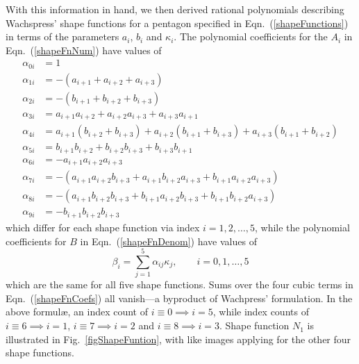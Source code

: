 With this information in hand, we then derived rational polynomials describing Wachspress' shape functions for a pentagon specified in Eqn.~(\ref{shapeFunctions}) in terms of the parameters $a_i$, $b_i$ and $\kappa_i$.  The polynomial coefficients for the $A_i$ in Eqn.~(\ref{shapeFnNum}) have values of
\begin{subequations}
	\label{shapeFnCoefs}
	\begin{align}
	\alpha_{0i} & = 1 \\
	\alpha_{1i} & = -( a_{i+1} + a_{i+2} + a_{i+3} ) \\
	\alpha_{2i} & = -( b_{i+1} + b_{i+2} + b_{i+3} ) \\
	\alpha_{3i} & = a_{i+1} a_{i+2} + a_{i+2} a_{i+3} + a_{i+3} a_{i+1} \\
	\alpha_{4i} & = a_{i+1} ( b_{i+2} + b_{i+3} ) + a_{i+2} ( b_{i+1} + 
	b_{i+3} ) + a_{i+3} ( b_{i+1} + b_{i+2} ) \\
	\alpha_{5i} & = b_{i+1} b_{i+2} + b_{i+2} b_{i+3} + b_{i+3} b_{i+1} \\
	\alpha_{6i} & = -a_{i+1} a_{i+2} a_{i+3} \\
	\alpha_{7i} & = -( a_{i+1} a_{i+2} b_{i+3} + a_{i+1} b_{i+2} a_{i+3} + 
	b_{i+1} a_{i+2} a_{i+3} ) \\
	\alpha_{8i} & = -( a_{i+1} b_{i+2} b_{i+3} + b_{i+1} a_{i+2} b_{i+3} + 
	b_{i+1} b_{i+2} a_{i+3} ) \\
	\alpha_{9i} & = -b_{i+1} b_{i+2} b_{i+3}
	\end{align}
\end{subequations}
which differ for each shape function via index $i = 1,2,\dots,5$, while the polynomial coefficients for $B$ in Eqn.~(\ref{shapeFnDenom}) have values of
\begin{equation}
\beta_i = \sum_{j=1}^5 \alpha_{ij} \kappa_j, \qquad i = 0, 1, \dots, 5
\end{equation}
which are the same for all five shape functions.  Sums over the four cubic terms in Eqn.~(\ref{shapeFnCoefs}) all vanish---a byproduct of Wachpress' formulation.  In the above formul\ae, an index count of $i \equiv 0 \implies i = 5$, while index counts of $i \equiv 6 \implies i = 1$, $i \equiv 7 \implies i = 2$ and $i \equiv 8 \implies i = 3$.  Shape function $N_1$ is illustrated in Fig.~\ref{figShapeFuntion}, with like images applying for the other four shape functions.

